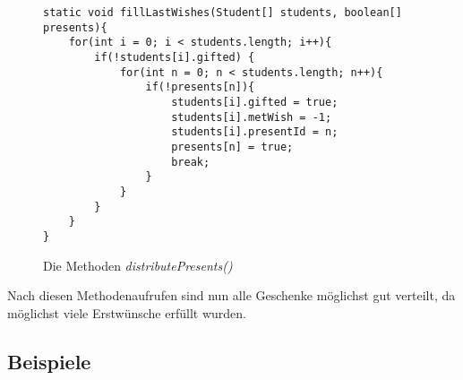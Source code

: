 \documentclass[a4paper, 12pt]{scrartcl}
\begin{document}
\begin{figure}[H]
\centering
\begin{lstlisting}
static void fillLastWishes(Student[] students, boolean[] presents){
    for(int i = 0; i < students.length; i++){
        if(!students[i].gifted) {
            for(int n = 0; n < students.length; n++){
                if(!presents[n]){
                    students[i].gifted = true;
                    students[i].metWish = -1;
                    students[i].presentId = n;
                    presents[n] = true;
                    break;
                }
            }
        }
    }
}
\end{lstlisting}
\caption{Die Methoden \emph{distributePresents()}}
\end{figure}

Nach diesen Methodenaufrufen sind nun alle Geschenke möglichst gut verteilt, da möglichst viele Erstwünsche erfüllt wurden.

\subsection{Beispiele}
\end{document}
